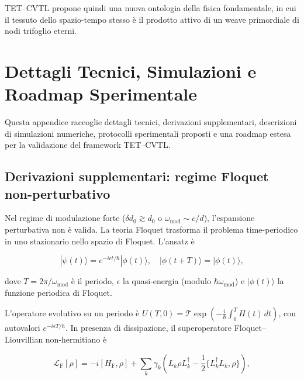 \documentclass[11pt,a4paper]{article}
\theoremstyle{plain}
\theoremstyle{definition}
\begin{document}
\begin{tcolorbox}
\vspace{0.3cm}

TET--CVTL propone quindi una nuova ontologia della fisica fondamentale, in cui il tessuto dello spazio-tempo stesso è il prodotto attivo di un weave primordiale di nodi trifoglio eterni.








\section{Dettagli Tecnici, Simulazioni e Roadmap Sperimentale}
\label{app:technical-details}

Questa appendice raccoglie dettagli tecnici, derivazioni supplementari, descrizioni di simulazioni numeriche, protocolli sperimentali proposti e una roadmap estesa per la validazione del framework TET--CVTL.



\vspace{0.3cm}

\subsection{Derivazioni supplementari: regime Floquet non-perturbativo}

Nel regime di modulazione forte ($\delta d_0 \gtrsim d_0$ o $\omega_{\mathrm{mod}} \sim c/d$), l'espansione perturbativa non è valida. La teoria Floquet trasforma il problema time-periodico in uno stazionario nello spazio di Floquet. L'ansatz è

\begin{equation}
|\psi(t)\rangle = e^{-i \epsilon t / \hbar} |\phi(t)\rangle, \quad |\phi(t+T)\rangle = |\phi(t)\rangle,
\end{equation}

dove $T = 2\pi / \omega_{\mathrm{mod}}$ è il periodo, $\epsilon$ la quasi-energia (modulo $\hbar \omega_{\mathrm{mod}}$) e $|\phi(t)\rangle$ la funzione periodica di Floquet.

L'operatore evolutivo su un periodo è $U(T,0) = \mathcal{T} \exp\left( -\frac{i}{\hbar} \int_0^T H(t)\, dt \right)$, con autovalori $e^{-i \epsilon T / \hbar}$. In presenza di dissipazione, il superoperatore Floquet–Liouvillian non-hermitiano è

\begin{equation}
\mathcal{L}_{\mathrm{F}}[\rho] = -i [H_{\mathrm{F}},\rho] + \sum_k \gamma_k \left( L_k \rho L_k^\dagger - \frac{1}{2} \{L_k^\dagger L_k, \rho\} \right),
\label{eq:floquet-liouvillian-app}
\end{equation}


\end{tcolorbox}
\end{document}
